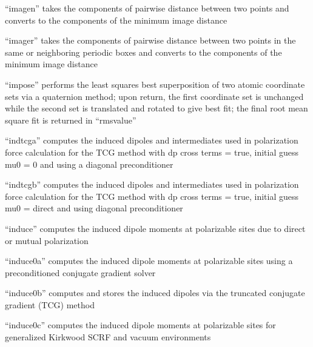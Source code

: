 \documentclass[letterpaper,11pt,english]{sphinxmanual}
\begin{document}

“imagen” takes the components of pairwise distance between
two points and converts to the components of the minimum
image distance


“imager” takes the components of pairwise distance between
two points in the same or neighboring periodic boxes and
converts to the components of the minimum image distance


“impose” performs the least squares best superposition
of two atomic coordinate sets via a quaternion method;
upon return, the first coordinate set is unchanged while
the second set is translated and rotated to give best fit;
the final root mean square fit is returned in “rmsvalue”


“indtcga” computes the induced dipoles and intermediates used
in polarization force calculation for the TCG method with dp
cross terms = true, initial guess mu0 = 0 and using a diagonal
preconditioner


“indtcgb” computes the induced dipoles and intermediates used
in polarization force calculation for the TCG method with dp
cross terms = true, initial guess mu0 = direct and using diagonal
preconditioner


“induce” computes the induced dipole moments at polarizable
sites due to direct or mutual polarization


“induce0a” computes the induced dipole moments at polarizable
sites using a preconditioned conjugate gradient solver


“induce0b” computes and stores the induced dipoles via
the truncated conjugate gradient (TCG) method


“induce0c” computes the induced dipole moments at polarizable
sites for generalized Kirkwood SCRF and vacuum environments

\end{document}
